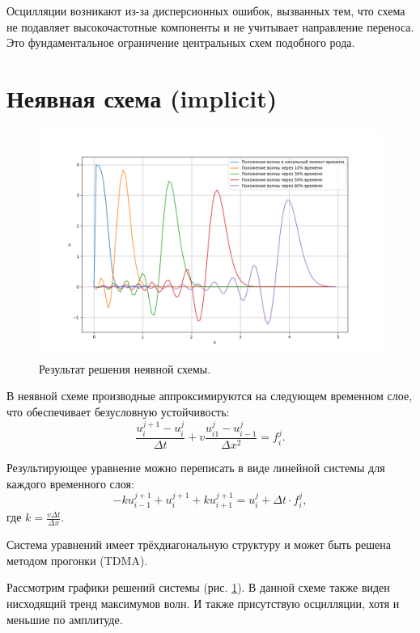 Осцилляции возникают из-за дисперсионных ошибок, вызванных тем, что схема не подавляет высокочастотные компоненты и не учитывает направление переноса. Это фундаментальное ограничение центральных схем подобного рода.
\section{Неявная схема (implicit)}
\begin{figure}[h]  %
	\centering
	\includegraphics[height=0.7\textwidth]{imgs/implicit.png}  %
	\caption{Результат решения неявной схемы.}  %
	\label{fig:implicit}  %
\end{figure}
В неявной схеме производные аппроксимируются на следующем временном слое, что обеспечивает безусловную устойчивость:
$$
	\frac{u_i^{j+1} - u_i^j}{\Delta t} + v \frac{u_{i1}^j - u_{i-1}^j}{\Delta x^2} =  f_{i}^{j}.
$$

Результирующее уравнение можно переписать в виде линейной системы для каждого временного слоя:
$$
	- k u_{i-1}^{j+1} + u_i^{j+1} + k u_{i+1}^{j+1} = u_i^j+ \Delta t \cdot  f_{i}^{j},
$$
где $ k = \frac{v \Delta t}{ \Delta x}.$

Система уравнений имеет трёхдиагональную структуру и может быть решена методом прогонки (TDMA).
\newline
 
Рассмотрим графики решений системы (рис. \ref{fig:implicit}). В данной схеме также виден нисходящий тренд максимумов волн. И также присутствую осцилляции, хотя и меньшие по амплитуде.
